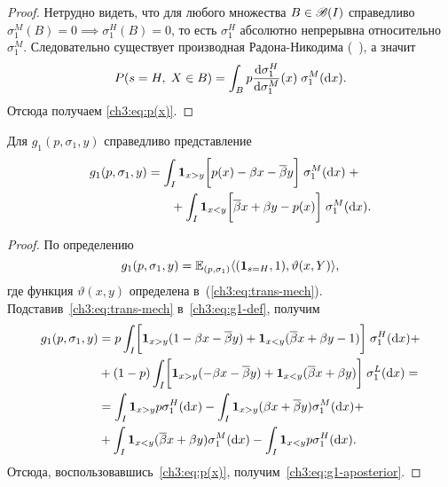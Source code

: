 {\begin{proof}
  Нетрудно видеть, что для любого множества $B \in \mathscr{B}(I)$ справедливо $\sigma^M_1(B) = 0 \implies \sigma^H_1(B) = 0$, то есть $\sigma^H_1$ абсолютно непрерывна относительно $\sigma^M_1$.
  Следовательно существует производная Радона-Никодима (\seename~\cite{kolmogorov-fomin}), а значит
  \begin{equation*}
    P(s = H, \; X \in B) =
    \int_B p \frac{\mathop{}\!\mathrm{d} \sigma^H_1}{\mathop{}\!\mathrm{d} \sigma^M_1}(x) \; \sigma^M_1(\mathop{}\!\mathrm{d} x).
  \end{equation*}
  Отсюда получаем \eqref{ch3:eq:p(x)}.
\end{proof}

\begin{proposition}
  Для $g_1(p, \sigma_1, y)$ справедливо представление
  \begin{equation}\label{ch3:eq:g1-aposterior}
    \begin{multlined}
      g_1(p, \sigma_1, y) = \int_I \Ind{x > y} \biggl[ p(x) - \Co x - \DCo y \biggr] \; \sigma^M_1(\di x) \; + \\
      + \int_I \Ind{x < y} \biggl[ \DCo x + \Co y - p(x) \biggr] \;
      \sigma^M_1(\di x).
    \end{multlined}
  \end{equation}
\end{proposition}
\begin{proof}
  По определению
  \begin{equation}\label{ch3:eq:g1-def}
    g_1(p, \sigma_1, y) = \operatorname{\mathbb{E}}_{( p, \sigma_1 )} \langle
    (\mathbf{1}_{s = H}, 1), \vartheta(x, Y)
    \rangle,
  \end{equation}
  где функция $\vartheta(x, y)$ определена в~(\ref{ch3:eq:trans-mech}).
  Подставив~\eqref{ch3:eq:trans-mech} в~\eqref{ch3:eq:g1-def}, получим
  \begin{align*}
    g_1(p, \sigma_1, y) 
    &= p \int_I \biggl[ \mathbf{1}_{x > y}(1 - \beta x - {{\overline{\beta}}} y) + \mathbf{1}_{x < y} ({{\overline{\beta}}} x + \beta y - 1) \biggr] \; \sigma^H_1(\mathop{}\!\mathrm{d} x) + \\
    &+ (1-p) \int_I \biggl[
      \mathbf{1}_{x > y} (- \beta x - {{\overline{\beta}}} y) + \mathbf{1}_{x < y}({{\overline{\beta}}} x + \beta y) 
    \biggr]
    \; \sigma^L_1(\mathop{}\!\mathrm{d} x) = \\
    &= \int_I \mathbf{1}_{x > y} p \sigma^H_1(\mathop{}\!\mathrm{d} x) -
    \int_I \mathbf{1}_{x > y} (\beta x + {{\overline{\beta}}} y) \sigma^M_1 (\mathop{}\!\mathrm{d} x) + \\
    &+ \int_I \mathbf{1}_{x < y} ({{\overline{\beta}}} x + \beta y) \sigma^M_1 (\mathop{}\!\mathrm{d} x) -
    \int_I \mathbf{1}_{x < y} p \sigma^H_1(\mathop{}\!\mathrm{d} x).
  \end{align*}
  Отсюда, воспользовавшись~\eqref{ch3:eq:p(x)}, получим~\eqref{ch3:eq:g1-aposterior}.
\end{proof}

}
